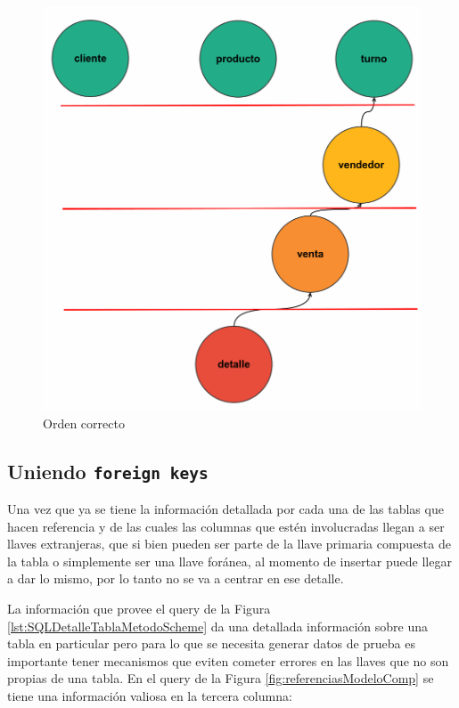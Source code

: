 \begin{figure}[H]
 \centering
 \includegraphics[scale=0.2]{images/ordenadocomp.png}
 \caption{Orden correcto}
 \label{ordencorrectonodos}
 \end{figure}
  
\subsection{Uniendo \texttt{foreign keys}}
Una vez que ya se tiene la informaci\'on detallada por cada una de las tablas que hacen referencia y de las cuales las columnas que est\'en involucradas llegan a ser llaves extranjeras, que si bien pueden ser parte de la llave primaria compuesta de la tabla o simplemente ser una llave for\'anea, al momento de insertar puede llegar a dar lo mismo, por lo tanto no se va a centrar en ese detalle.

La informaci\'on que provee el query de la Figura \ref{lst:SQLDetalleTablaMetodoScheme} da una detallada informaci\'on sobre una tabla en particular pero para lo que se necesita generar datos de prueba es importante tener mecanismos que eviten cometer errores en las llaves que no son propias de una tabla. En el query de la Figura \ref{fig:referenciasModeloComp} se tiene una informaci\'on valiosa en la tercera columna:


